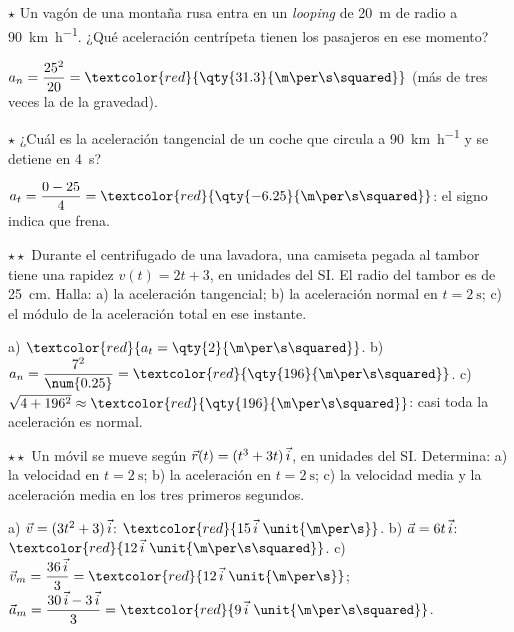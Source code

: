 \begin{exercise}
    \(\star\) Un vagón de una montaña rusa entra en un \textit{looping} de \qty{20}{\m} de radio a \qty{90}{\km\per\hour}. ¿Qué
    aceleración centrípeta tienen los pasajeros en ese momento?
    \begin{solu}
        \(a_n = \dfrac{25^2}{20} = \textcolor{red}{\qty{31.3}{\m\per\s\squared}}\) (más de tres veces la de la gravedad).
    \end{solu}
\end{exercise}

\begin{exercise}
    \(\star\) ¿Cuál es la aceleración tangencial de un coche que circula a \qty{90}{\km\per\hour} y se detiene en \qty{4}{\s}?
    \begin{solu}
        \(a_t = \dfrac{0 - 25}{4} = \textcolor{red}{\qty{-6.25}{\m\per\s\squared}}\): el signo indica que frena.
    \end{solu}
\end{exercise}

\begin{exercise}
    \(\star\star\) Durante el centrifugado de una lavadora, una camiseta pegada al tambor tiene una rapidez \(v(t) = 2t + 3\), en
    unidades del SI. El radio del tambor es de \qty{25}{\cm}. Halla: a) la aceleración tangencial; b) la aceleración normal en
    \(t = \qty{2}{\s}\); c) el módulo de la aceleración total en ese instante.
    \begin{solu}
        a) \(\textcolor{red}{a_t = \qty{2}{\m\per\s\squared}}\). b) \(a_n = \dfrac{7^2}{\num{0.25}} = \textcolor{red}{\qty{196}{\m\per\s\squared}}\).
        c) \(\sqrt{4 + 196^2} \approx \textcolor{red}{\qty{196}{\m\per\s\squared}}\): casi toda la aceleración es normal.
    \end{solu}
\end{exercise}

\begin{exercise}
    \(\star\star\) Un móvil se mueve según \(\vec r(t) = (t^3 + 3t)\,\vec{i}\), en unidades del SI. Determina: a) la velocidad en
    \(t = \qty{2}{\s}\); b) la aceleración en \(t = \qty{2}{\s}\); c) la velocidad media y la aceleración media en los tres primeros
    segundos.
    \begin{solu}
        a) \(\vec v = (3t^2 + 3)\,\vec{i}\): \(\textcolor{red}{15\,\ivec~\unit{\m\per\s}}\). b) \(\vec a = 6t\,\vec{i}\): \(\textcolor{red}{12\,\ivec~\unit{\m\per\s\squared}}\).
        c) \(\vec v_m = \dfrac{36\,\ivec}{3} = \textcolor{red}{12\,\ivec~\unit{\m\per\s}}\); \(\vec a_m = \dfrac{30\,\ivec - 3\,\ivec}{3} = \textcolor{red}{9\,\ivec~\unit{\m\per\s\squared}}\).
    \end{solu}
\end{exercise}

